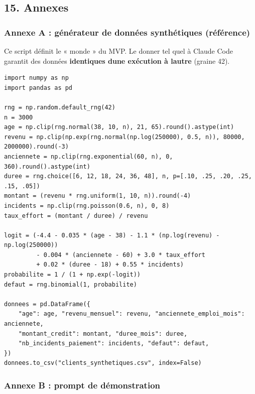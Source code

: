 \documentclass[
  french,
  11pt,
  a4paper,
]{article}
\begin{document}
\subsection{15. Annexes}\label{15-annexes}

\subsubsection{Annexe A : générateur de données synthétiques
(référence)}\label{annexe-a--guxe9nuxe9rateur-de-donnuxe9es-synthuxe9tiques-ruxe9fuxe9rence}

Ce script définit le « monde » du MVP. Le donner tel quel à Claude Code
garantit des données \textbf{identiques d\textquotesingle une exécution
à l\textquotesingle autre} (graine 42).

\begin{Verbatim}[breaklines=true,breakanywhere=true,fontsize=\small,frame=leftline,framerule=1.6pt,rulecolor=\color{credixblue},framesep=3mm,xleftmargin=2mm,xrightmargin=1mm]
import numpy as np
import pandas as pd

rng = np.random.default_rng(42)
n = 3000
age = np.clip(rng.normal(38, 10, n), 21, 65).round().astype(int)
revenu = np.clip(np.exp(rng.normal(np.log(250000), 0.5, n)), 80000, 2000000).round(-3)
anciennete = np.clip(rng.exponential(60, n), 0, 360).round().astype(int)
duree = rng.choice([6, 12, 18, 24, 36, 48], n, p=[.10, .25, .20, .25, .15, .05])
montant = (revenu * rng.uniform(1, 10, n)).round(-4)
incidents = np.clip(rng.poisson(0.6, n), 0, 8)
taux_effort = (montant / duree) / revenu

logit = (-4.4 - 0.035 * (age - 38) - 1.1 * (np.log(revenu) - np.log(250000))
         - 0.004 * (anciennete - 60) + 3.0 * taux_effort
         + 0.02 * (duree - 18) + 0.55 * incidents)
probabilite = 1 / (1 + np.exp(-logit))
defaut = rng.binomial(1, probabilite)

donnees = pd.DataFrame({
    "age": age, "revenu_mensuel": revenu, "anciennete_emploi_mois": anciennete,
    "montant_credit": montant, "duree_mois": duree,
    "nb_incidents_paiement": incidents, "defaut": defaut,
})
donnees.to_csv("clients_synthetiques.csv", index=False)
\end{Verbatim}

\subsubsection{Annexe B : prompt de
démonstration}\label{annexe-b--prompt-de-duxe9monstration}
\end{document}

